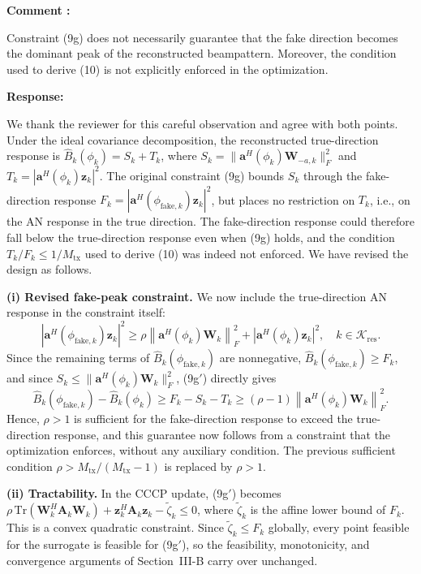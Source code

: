 \documentclass[a4paper,12pt]{article}
\newcounter{reviewcomment}
\newenvironment{reviewcomment}{%
  \stepcounter{reviewcomment}%
  \begin{shaded}
  \textbf{Comment \thereviewcomment:}\par
}{\end{shaded}}
\newenvironment{response}{\par\textbf{Response:}\par}{\par}
\begin{document}
\begin{reviewcomment}
Constraint (9g) does not necessarily guarantee that the fake direction
becomes the dominant peak of the reconstructed beampattern. Moreover, the
condition used to derive (10) is not explicitly enforced in the
optimization.
\end{reviewcomment}
\begin{response}
We thank the reviewer for this careful observation and agree with both
points. Under the ideal covariance decomposition, the reconstructed
true-direction response is $\widehat{B}_k(\phi_k)=S_k+T_k$, where
$S_k=\|\mathbf{a}^H(\phi_k)\mathbf{W}_{-a,k}\|_F^2$ and
$T_k=|\mathbf{a}^H(\phi_k)\mathbf{z}_k|^2$. The original constraint (9g)
bounds $S_k$ through the fake-direction response
$F_k=|\mathbf{a}^H(\phi_{\mathrm{fake},k})\mathbf{z}_k|^2$, but places no
restriction on $T_k$, i.e., on the AN response in the true direction. The
fake-direction response could therefore fall below the true-direction
response even when (9g) holds, and the condition $T_k/F_k\le1/M_{\mathrm{tx}}$
used to derive (10) was indeed not enforced. We have revised the design as
follows.

\textbf{(i) Revised fake-peak constraint.} We now include the
true-direction AN response in the constraint itself:
\begin{equation*}
\left|\mathbf{a}^H(\phi_{\mathrm{fake},k})\mathbf{z}_k\right|^2
\ge\rho\left\|\mathbf{a}^H(\phi_k)\mathbf{W}_k\right\|_F^2
+\left|\mathbf{a}^H(\phi_k)\mathbf{z}_k\right|^2,\quad k\in\mathcal{K}_{\mathrm{res}}.
\tag{9g$'$}
\end{equation*}
Since the remaining terms of $\widehat{B}_k(\phi_{\mathrm{fake},k})$ are
nonnegative, $\widehat{B}_k(\phi_{\mathrm{fake},k})\ge F_k$, and since
$S_k\le\|\mathbf{a}^H(\phi_k)\mathbf{W}_k\|_F^2$, (9g$'$) directly gives
\begin{equation*}
\widehat{B}_k(\phi_{\mathrm{fake},k})-\widehat{B}_k(\phi_k)
\ge F_k-S_k-T_k
\ge(\rho-1)\left\|\mathbf{a}^H(\phi_k)\mathbf{W}_k\right\|_F^2.
\tag{10$'$}
\end{equation*}
Hence, $\rho>1$ is sufficient for the fake-direction response to exceed the
true-direction response, and this guarantee now follows from a constraint
that the optimization enforces, without any auxiliary condition. The
previous sufficient condition $\rho>M_{\mathrm{tx}}/(M_{\mathrm{tx}}-1)$ is
replaced by $\rho>1$.

\textbf{(ii) Tractability.} In the CCCP update, (9g$'$) becomes
$\rho\,\mathrm{Tr}(\mathbf{W}_k^H\mathbf{A}_k\mathbf{W}_k)
+\mathbf{z}_k^H\mathbf{A}_k\mathbf{z}_k-\widetilde{\zeta}_k\le0$, where
$\widetilde{\zeta}_k$ is the affine lower bound of $F_k$. This is a convex
quadratic constraint. Since $\widetilde{\zeta}_k\le F_k$ globally, every
point feasible for the surrogate is feasible for (9g$'$), so the
feasibility, monotonicity, and convergence arguments of Section~III-B carry
over unchanged.


\end{response}
\end{document}
